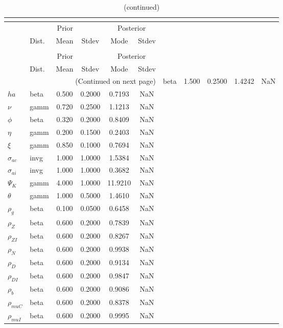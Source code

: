  
\begin{center}
\begin{longtable}{llcccc} 
\caption{Results from posterior maximization (parameters)}\\
 \label{Table:Posterior:1}\\
\toprule 
  & \multicolumn{3}{c}{Prior}  &  \multicolumn{2}{c}{Posterior} \\
  \cmidrule(r{.75em}){2-4} \cmidrule(r{.75em}){5-6}
  & Dist. & Mean  & Stdev & Mode & Stdev \\ 
\midrule \endfirsthead 
\caption{(continued)}\\
 \bottomrule 
  & \multicolumn{3}{c}{Prior}  &  \multicolumn{2}{c}{Posterior} \\
  \cmidrule(r{.75em}){2-4} \cmidrule(r{.75em}){5-6}
  & Dist. & Mean  & Stdev & Mode & Stdev \\ 
\midrule \endhead 
\bottomrule \multicolumn{6}{r}{(Continued on next page)}\endfoot 
\bottomrule\endlastfoot 
${\sigma}$ & beta &   1.500 & 0.2500 &   1.4242 &     NaN \\ 
${ha}$ & beta &   0.500 & 0.2000 &   0.7193 &     NaN \\ 
$\nu$ & gamm &   0.720 & 0.2500 &   1.1213 &     NaN \\ 
${\phi}$ & beta &   0.320 & 0.2000 &   0.8409 &     NaN \\ 
${\eta}$ & gamm &   0.200 & 0.1500 &   0.2403 &     NaN \\ 
$\xi$ & gamm &   0.850 & 0.1000 &   0.7694 &     NaN \\ 
${\sigma_{ac}}$ & invg &   1.000 & 1.0000 &   1.5384 &     NaN \\ 
${\sigma_{ai}}$ & invg &   1.000 & 1.0000 &   0.3682 &     NaN \\ 
${\Psi_{K}}$ & gamm &   4.000 & 1.0000 &  11.9210 &     NaN \\ 
${\theta}$ & gamm &   1.000 & 0.5000 &   1.4610 &     NaN \\ 
${\rho_g}$ & beta &   0.100 & 0.0500 &   0.6458 &     NaN \\ 
${\rho_Z}$ & beta &   0.600 & 0.2000 &   0.7839 &     NaN \\ 
${\rho_{ZI}}$ & beta &   0.600 & 0.2000 &   0.8267 &     NaN \\ 
${\rho_N}$ & beta &   0.600 & 0.2000 &   0.9938 &     NaN \\ 
${\rho_D}$ & beta &   0.600 & 0.2000 &   0.9134 &     NaN \\ 
${\rho_{DI}}$ & beta &   0.600 & 0.2000 &   0.9847 &     NaN \\ 
${\rho_b}$ & beta &   0.600 & 0.2000 &   0.9086 &     NaN \\ 
${\rho_{muC}}$ & beta &   0.600 & 0.2000 &   0.8378 &     NaN \\ 
${\rho_{muI}}$ & beta &   0.600 & 0.2000 &   0.9995 &     NaN \\ 
\end{longtable}
 \end{center}
